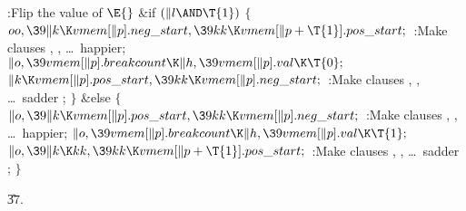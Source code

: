 \Y\B\4:Flip the value of \X${}\E{}$\6
\&{if} ${}(\|l\AND\T{1}){}$\5
${}\{{}$\1\6
${}\\{oo},\39\|k\K\\{vmem}[\|p].\\{neg\_start},\39\\{kk}\K\\{vmem}[\|p+\T{1}].%
\\{pos\_start};{}$\6
:Make clauses , , \dots\
happier\X;\6
${}\|o,\39\\{vmem}[\|p].\\{breakcount}\K\|h,\39\\{vmem}[\|p].\\{val}\K\T{0};{}$%
\6
${}\|k\K\\{vmem}[\|p].\\{pos\_start},\39\\{kk}\K\\{vmem}[\|p].\\{neg%
\_start};{}$\6
:Make clauses , , \dots\ sadder%
\X;\6
\4${}\}{}$\5
\2\&{else}\5
${}\{{}$\1\6
${}\|o,\39\|k\K\\{vmem}[\|p].\\{pos\_start},\39\\{kk}\K\\{vmem}[\|p].\\{neg%
\_start};{}$\6
:Make clauses , , \dots\
happier\X;\6
${}\|o,\39\\{vmem}[\|p].\\{breakcount}\K\|h,\39\\{vmem}[\|p].\\{val}\K\T{1};{}$%
\6
${}\|o,\39\|k\K\\{kk},\39\\{kk}\K\\{vmem}[\|p+\T{1}].\\{pos\_start};{}$\6
:Make clauses , , \dots\ sadder%
\X;\6
\4${}\}{}$\2\par
\U37.\fi

